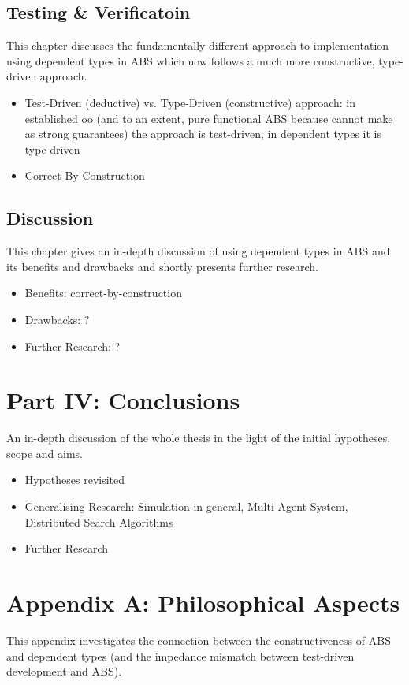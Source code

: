 \subsection{Testing \& Verificatoin}
This chapter discusses the fundamentally different approach to implementation using dependent types in ABS which now follows a much more constructive, type-driven approach.
\begin{itemize}
	\item Test-Driven (deductive) vs. Type-Driven (constructive) approach: in established oo (and to an extent, pure functional ABS because cannot make as strong guarantees) the approach is test-driven, in dependent types it is type-driven
	\item Correct-By-Construction
\end{itemize}

\subsection{Discussion}
This chapter gives an in-depth discussion of using dependent types in ABS and its benefits and drawbacks and shortly presents further research.
\begin{itemize}
	\item Benefits: correct-by-construction
	\item Drawbacks: ?
	\item Further Research: ?
\end{itemize}

\section{Part IV: Conclusions}
An in-depth discussion of the whole thesis in the light of the initial hypotheses, scope and aims.
\begin{itemize}
	\item Hypotheses revisited
	\item Generalising Research: Simulation in general, Multi Agent System, Distributed Search Algorithms
	\item Further Research
\end{itemize}

\section{Appendix A: Philosophical Aspects}
This appendix investigates the connection between the constructiveness of ABS and dependent types (and the impedance mismatch between test-driven development and ABS).